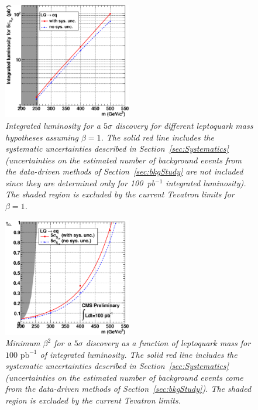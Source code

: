\begin{figure}[h!]
 \centering
  \includegraphics[width=0.5\textwidth]{plots/cmsPotential/L5sigma_vs_m_log.eps}
 \caption{\small \sl Integrated luminosity for a $5\sigma$ discovery for different leptoquark mass hypotheses assuming $\beta=1$. 
The solid red line includes the systematic uncertainties described in Section~\ref{sec:Systematics} 
(uncertainties on the estimated number of background events from the data-driven methods
of Section~\ref{sec:bkgStudy} are not included since they are determined only for 100~pb$^{-1}$ integrated luminosity). 
The shaded region is excluded by the current Tevatron limits for $\beta=1$.\label{fig:discovery}}
\end{figure}

\begin{figure}[h!]
 \centering
  \includegraphics[width=0.5\textwidth]{plots/cmsPotential/beta2_vs_m.eps}
 \caption{\small \sl Minimum $\beta^2$ for
a $5\sigma$ discovery as a function of leptoquark mass for $100\text{ pb}^{-1}$ of integrated luminosity. The solid red line includes the systematic
uncertainties described in Section~\ref{sec:Systematics} 
(uncertainties on the estimated number of background events come from the data-driven methods of Section~\ref{sec:bkgStudy}). 
The shaded region is excluded by the current Tevatron limits.
\label{fig:discovery_beta}}
\end{figure}


